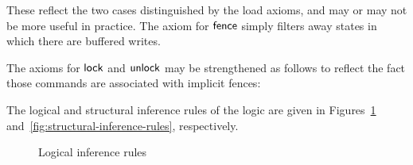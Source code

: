 \documentclass[11pt]{article}
\begin{document}
These reflect the two cases distinguished by the load axioms, and may or may not be more useful in practice. The axiom for $\operatorname{\mathsf{fence}}$ simply filters away states in which there are buffered writes. 

The axioms for $\operatorname{\mathsf{lock}}$ and $\operatorname{\mathsf{unlock}}$ may be strengthened as follows to reflect the fact those commands are associated with implicit fences: 


The logical and structural inference rules of the logic are given in Figures~\ref{fig:logical-inference-rules} and~\ref{fig:structural-inference-rules}, respectively.

\begin{figure}[ht]
	\centering
	\caption{\label{fig:logical-inference-rules}Logical inference rules}
\end{figure}
\end{document}
